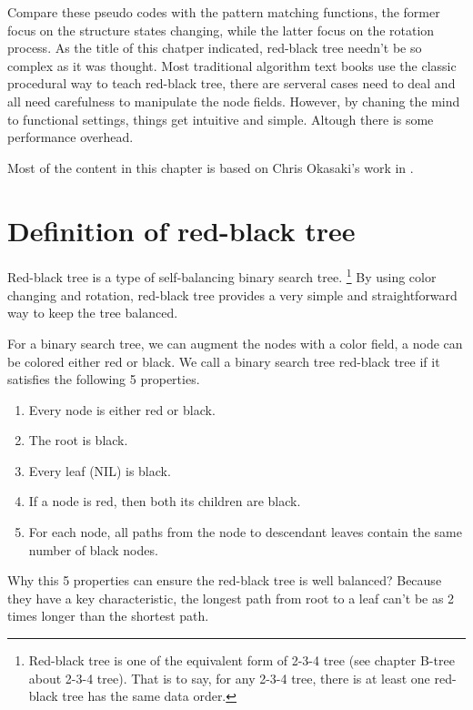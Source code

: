 \documentclass{article}
\begin{document}
Compare these pseudo codes with the pattern matching functions, 
the former focus on the structure states changing, while the 
latter focus on the rotation process. As the title of this 
chatper indicated, red-black tree needn't be so complex as it 
was thought. Most traditional algorithm text books use the 
classic procedural way to teach red-black tree, there are 
serveral cases need to deal and all need carefulness to 
manipulate the node fields. However, by chaning
the mind to functional settings, things get intuitive and
simple. Altough there is some performance overhead.

Most of the content in this chapter is based on Chris Okasaki's
work in \cite{okasaki}.

\section{Definition of red-black tree}

Red-black tree is a type of self-balancing binary search tree\cite{wiki}. 
\footnote{Red-black tree is one of the equivalent form of 2-3-4 tree (see chapter
B-tree about 2-3-4 tree). That is to say, for any 2-3-4 tree, there is at least 
one red-black tree has the same data order.} By using color changing and rotation, 
red-black tree provides a very simple and straightforward way to keep 
the tree balanced.

For a binary search tree, we can augment the nodes with a color field, a node
can be colored either red or black. We call a binary search tree red-black tree 
if it satisfies the following 5 properties\cite{CLRS}.

\begin{enumerate}
\item Every node is either red or black.
\item The root is black.
\item Every leaf (NIL) is black.
\item If a node is red, then both its children are black.
\item For each node, all paths from the node to descendant leaves contain the same number of black nodes.
\end{enumerate}

Why this 5 properties can ensure the red-black tree is well balanced? 
Because they have a key characteristic, the longest path from root to 
a leaf can't be as 2 times longer than the shortest path.
\end{document}
